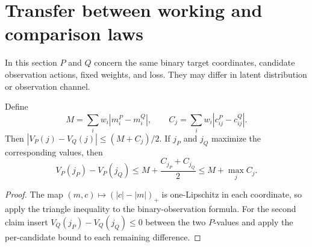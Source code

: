 \section{Transfer between working and comparison laws}

In this section $P$ and $Q$ concern the same binary target coordinates,
candidate observation actions, fixed weights, and loss. They may differ
in latent distribution or observation channel.

\begin{proposition}
\label{prop:moment-transfer-r3}
Define
\[
 M=\sum_i w_i|m_i^P-m_i^Q|,
 \qquad C_j=\sum_i w_i|c_{ij}^P-c_{ij}^Q|.
\]
Then
$|V_P(j)-V_Q(j)|\le(M+C_j)/2$.
If $j_P$ and $j_Q$ maximize the corresponding values, then
\[
 V_P(j_P)-V_P(j_Q)
 \le M+\frac{C_{j_P}+C_{j_Q}}{2}
 \le M+\max_j C_j.
\]
\end{proposition}
\begin{proof}
The map $(m,c)\mapsto(|c|-|m|)_+$ is one-Lipschitz in each coordinate,
so apply the triangle inequality to the binary-observation formula.
For the second claim insert
$V_Q(j_P)-V_Q(j_Q)\le0$ between the two $P$-values and apply the
per-candidate bound to each remaining difference.
\end{proof}

